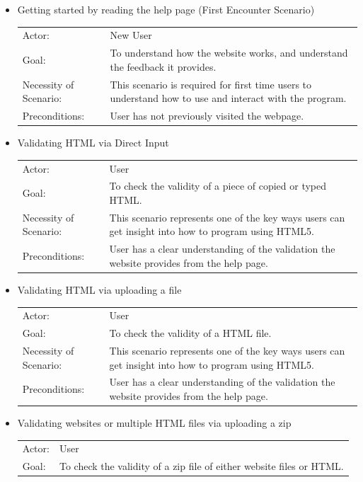 \documentclass[10pt]{article}
\begin{document}
\begin{itemize}
\item Getting started by reading the help page (First Encounter Scenario) \\
\begin{tabular}{l p{3.5in}}
Actor: & New User \\
Goal: & To understand how the website works, and understand the feedback it provides. \\
Necessity of Scenario: & This scenario is required for first time users to understand how to use and interact with the program. \\
Preconditions: & User has not previously visited the webpage. \\
\end{tabular}
\item Validating HTML via Direct Input \\
\begin{tabular}{l p{3.5in}}
Actor: & User \\
Goal: & To check the validity of a piece of copied or typed HTML. \\
Necessity of Scenario: & This scenario represents one of the key ways users can get insight into how to program using HTML5. \\
Preconditions: & User has a clear understanding of the validation the website provides from the help page. \\
\end{tabular}
\item Validating HTML via uploading a file \\
\begin{tabular}{l p{3.5in}}
Actor: & User \\
Goal: & To check the validity of a HTML file. \\
Necessity of Scenario: & This scenario represents one of the key ways users can get insight into how to program using HTML5. \\
Preconditions: & User has a clear understanding of the validation the website provides from the help page. \\
\end{tabular}
\item Validating websites or multiple HTML files via uploading a zip \\
\begin{tabular}{l p{3.5in}}
Actor: & User \\
Goal: & To check the validity of a zip file of either website files or HTML. \\

\end{tabular}
\end{itemize}
\end{document}
